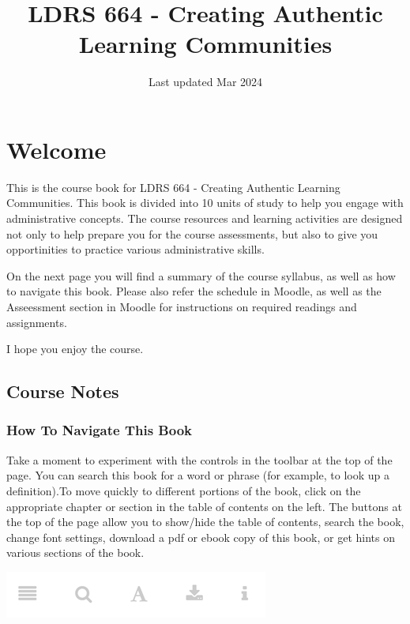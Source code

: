 \documentclass[
]{book}
\title{LDRS 664 - Creating Authentic Learning Communities}
\author{}
\date{\vspace{-2.5em}Last updated Mar 2024}
\begin{document}
\maketitle

{
\setcounter{tocdepth}{1}
\tableofcontents
}
\hypertarget{welcome}{%
\chapter*{Welcome}\label{welcome}}

This is the course book for LDRS 664 - Creating Authentic Learning Communities. This book is divided into 10 units of study to help you engage with administrative concepts. The course resources and learning activities are designed not only to help prepare you for the course assessments, but also to give you opportinities to practice various administrative skills.

On the next page you will find a summary of the course syllabus, as well as how to navigate this book. Please also refer the schedule in Moodle, as well as the Asseessment section in Moodle for instructions on required readings and assignments.

I hope you enjoy the course.

\hypertarget{course-notes}{%
\section*{Course Notes}\label{course-notes}}

\hypertarget{how-to-navigate-this-book}{%
\subsection*{How To Navigate This Book}\label{how-to-navigate-this-book}}

Take a moment to experiment with the controls in the toolbar at the top of the page. You can search this book for a word or phrase (for example, to look up a definition).To move quickly to different portions of the book, click on the appropriate chapter or section in the table of contents on the left. The buttons at the top of the page allow you to show/hide the table of contents, search the book, change font settings, download a pdf or ebook copy of this book, or get hints on various sections of the book.

\includegraphics{assets/course-intro/menu.png}
\end{document}
